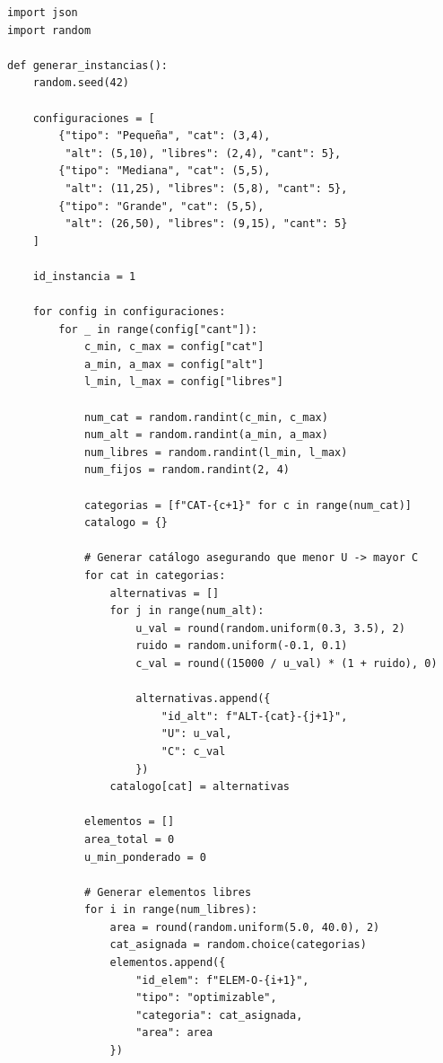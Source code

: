 \documentclass[journal, 12pt, onecolumn]{IEEEtran}
\begin{document}
\begin{lstlisting}
import json
import random

def generar_instancias():
    random.seed(42)
    
    configuraciones = [
        {"tipo": "Pequeña", "cat": (3,4), 
         "alt": (5,10), "libres": (2,4), "cant": 5},
        {"tipo": "Mediana", "cat": (5,5), 
         "alt": (11,25), "libres": (5,8), "cant": 5},
        {"tipo": "Grande", "cat": (5,5), 
         "alt": (26,50), "libres": (9,15), "cant": 5}
    ]
    
    id_instancia = 1
    
    for config in configuraciones:
        for _ in range(config["cant"]):
            c_min, c_max = config["cat"]
            a_min, a_max = config["alt"]
            l_min, l_max = config["libres"]
            
            num_cat = random.randint(c_min, c_max)
            num_alt = random.randint(a_min, a_max)
            num_libres = random.randint(l_min, l_max)
            num_fijos = random.randint(2, 4)
            
            categorias = [f"CAT-{c+1}" for c in range(num_cat)]
            catalogo = {}
            
            # Generar catálogo asegurando que menor U -> mayor C
            for cat in categorias:
                alternativas = []
                for j in range(num_alt):
                    u_val = round(random.uniform(0.3, 3.5), 2)
                    ruido = random.uniform(-0.1, 0.1)
                    c_val = round((15000 / u_val) * (1 + ruido), 0)
                    
                    alternativas.append({
                        "id_alt": f"ALT-{cat}-{j+1}", 
                        "U": u_val, 
                        "C": c_val
                    })
                catalogo[cat] = alternativas
                
            elementos = []
            area_total = 0
            u_min_ponderado = 0
            
            # Generar elementos libres
            for i in range(num_libres):
                area = round(random.uniform(5.0, 40.0), 2)
                cat_asignada = random.choice(categorias)
                elementos.append({
                    "id_elem": f"ELEM-O-{i+1}",
                    "tipo": "optimizable",
                    "categoria": cat_asignada,
                    "area": area
                })
                

\end{lstlisting}
\end{document}
